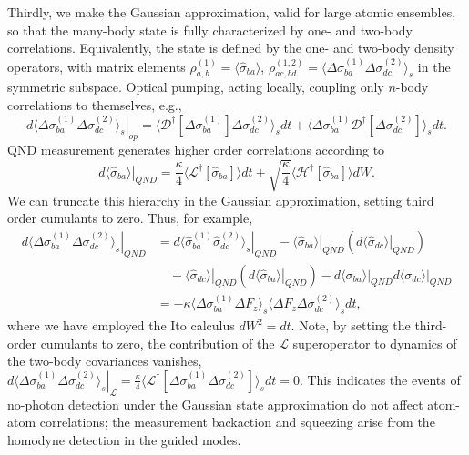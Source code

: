 \documentclass[preprint,aps,pra,onecolumn,superscriptaddress]{revtex4-1} %
\newcommand{\expect}[1]{\big\langle #1 \big\rangle}
\begin{document}
Thirdly, we make the Gaussian approximation, valid for large atomic ensembles, so that the many-body state is fully characterized by one- and two-body correlations. Equivalently, the state is defined by the one- and two-body density operators, with matrix elements $\rho^{(1)}_{a, b} =\expect{\hat{\sigma}_{ba}}$, $\rho^{(1,2)}_{ac,bd}=\expect{\Delta \sigma_{ba}^{(1)}\Delta\sigma_{dc}^{(2)} }_s$ in the symmetric subspace.   Optical pumping, acting locally, coupling only $n$-body correlations to themselves, e.g.,
\begin{equation}\label{eq:dsigmabadc_op}
\left.d\expect{\Delta \sigma_{ba}^{(1)}\Delta\sigma_{dc}^{(2)} }_s\right|_{op} = \expect{\mathcal{D}^\dagger[\Delta \sigma_{ba}^{(1)}]\Delta\sigma_{dc}^{(2)} }_sdt + \expect{\Delta \sigma_{ba}^{(1)} \mathcal{D}^\dagger[\Delta\sigma_{dc}^{(2)}] }_sdt .
\end{equation}
QND measurement generates higher order correlations according to
\begin{equation}\label{eq:dsigmaba_QND}
\left.d\expect{\hat{\sigma}_{ba}}\right|_{QND} =\frac{\kappa}{4}\expect{\mathcal{L}^\dagger\left[\hat{\sigma}_{ba} \right]}dt + \sqrt{\frac{\kappa}{4}}\expect{\mathcal{H}^\dagger\left[\hat{\sigma}_{ba} \right]}dW .
\end{equation}
We can truncate this hierarchy in the Gaussian approximation, setting third order cumulants to zero.  Thus, for example,
\begin{align}
\left.d\expect{\Delta \sigma_{ba}^{(1)} \Delta \sigma_{dc}^{(2)}}_s \right|_{QND} &= \left.d\expect{\hat{\sigma}_{ba}^{(1)} \hat{\sigma}_{dc}^{(2)}}_s \right|_{QND} - \left. \expect{\hat{\sigma}_{ba}} \right|_{QND} \left( \left.d\expect{\hat{\sigma}_{dc}} \right|_{QND}\right) \nonumber\\
&\quad - \left. \expect{\hat{\sigma}_{dc}} \right|_{QND} \left( \left.d\expect{\hat{\sigma}_{ba}} \right|_{QND}\right)
- \left.d\expect{\sigma_{ba}} \right|_{QND}\left.d\expect{\sigma_{dc}} \right|_{QND} \nonumber \\
&= -\kappa\expect{\Delta \sigma^{(1)}_{ba}  \Delta F_z }_s \expect{\Delta F_z \Delta \sigma_{dc}^{(2)} }_sdt,\label{eq:dsigmabadc_QND}
\end{align}
where we have employed the Ito calculus $dW^2 = dt$.
Note, by setting the third-order cumulants to zero,  the contribution of the $\mathcal{L}$ superoperator to dynamics of the two-body covariances vanishes,  $ \left.d\expect{\Delta \sigma_{ba}^{(1)} \Delta \sigma_{dc}^{(2)}}_s\right|_\mathcal{L} =\frac{\kappa}{4}\expect{\mathcal{L}^\dagger\left[\Delta\sigma_{ba}^{(1)}\Delta\sigma_{dc}^{(2)} \right]}_sdt=0 $.  This indicates the events of no-photon detection under the Gaussian state approximation do not affect atom-atom correlations;  the measurement backaction and squeezing arise from the homodyne detection in the guided modes. 
\end{document}
